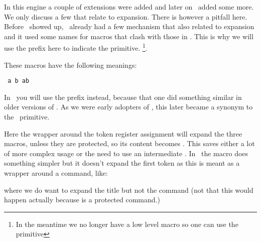 
\stopsectionlevel

\startsectionlevel[title={\ETEX\ primitives}]

In this engine a couple of extensions were added and later on \PDFTEX\ added some
more. We only discuss a few that relate to expansion. There is however a pitfall
here. Before \ETEX\ showed up, \CONTEXT\ already had a few mechanism that also
related to expansion and it used some names for macros that clash with those in
\ETEX. This is why we will use the \type {\normal} prefix here to indicate the
primitive. \footnote {In the meantime we no longer have a low level \type
{\protected} macro so one can use the primitive}.

\startbuffer
\def\MyMacroA{a}
\def\MyMacroB{b}
\normalprotected{}
\edef\MyMacroABC{\MyMacroA\MyMacroB\MyMacroC}
\stopbuffer

\typebuffer[option=TEX] \getbuffer

These macros have the following meanings:

\startlines \tt
\meaning\MyMacroA
\meaning\MyMacroB
\meaning\MyMacroC
\meaning\MyMacroABC
\stoplines

In \CONTEXT\ you will use the \type {\unexpanded} prefix instead, because that one
did something similar in older versions of \CONTEXT. As we were early adopters of
\ETEX, this later became a synonym to the \ETEX\ primitive.

\startbuffer
\def\MyMacroA{a}
\def\MyMacroB{b}
\normalprotected{}
\normalexpanded{\scratchtoks{\MyMacroA\MyMacroB\MyMacroC}}
\stopbuffer

\typebuffer[option=TEX] \getbuffer

Here the wrapper around the token register assignment will expand the three
macros, unless they are protected, so its content becomes \MyShow. This saves
either a lot of more complex \type {\expandafter} usage or the need to use an intermediate
\type {\edef}. In \CONTEXT\ the \type {\expanded} macro does something simpler
but it doesn't expand the first token as this is meant as a wrapper around a command,
like:

\starttyping[option=TEX]
\stoptyping

where we do want to expand the title but not the \type {\chapter} command (not
that this would happen actually because \type {\chapter} is a protected command.)

